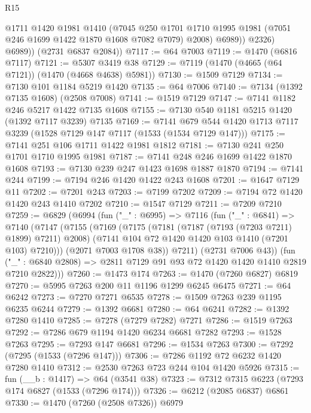 \begin{lexlean}{R15}
\begin{coremodule}
                @1711
                @1420
                @1981
                @1410
                (@7045
                  @250
                  @1701
                  @1710
                  @1995
                  @1981
                  (@7051 @246 @1699 @1422 @1870 @1608 @7082 @7079)
                  @2008)
                @6989))
            @2326)
          @6989))
      (@2731 @6837 @2084))
@7117 := @64 @7003
@7119 := @1470 (@6816 @7117)
@7121 := @5307 @3419 @38
@7129 := @7119 (@1470 (@4665 (@64 @7121)) (@1470 (@4668 @4638) @5981))
@7130 := @1509 @7129
@7134 := @7130 @101 @1184 @5219 @1420
@7135 := @64 @7006
@7140 := @7134 (@1392 @7135 @1608) (@2508 @7008)
@7141 := @1519 @7129
@7147 := @7141 @1182 @246 @5217 @1422 @7135 @1608
@7155 := @7130 @540 @1181 @5215 @1420 (@1392 @7117 @3239) @7135
@7169 := @7141 @679 @544 @1420 @1713 @7117 @3239 (@1528 @7129 @147 @7117 (@1533 (@1534 @7129 @147)))
@7175 := @7141 @251 @106 @1711 @1422 @1981 @1812
@7181 := @7130 @241 @250 @1701 @1710 @1995 @1981
@7187 := @7141 @248 @246 @1699 @1422 @1870 @1608
@7193 := @7130 @239 @247 @1423 @1698 @1887 @1870
@7194 := @7141 @244
@7199 := @7194 @246 @1420 @1422 @243 @1608
@7201 := @1647 @7129 @11
@7202 := @7201 @243
@7203 := @7199 @7202
@7209 := @7194 @72 @1420 @1420 @243 @1410 @7202
@7210 := @1547 @7129
@7211 := @7209 @7210
@7259 := @6829
    (@6994
      (fun ("_" : @6995) =>
      @7116
        (fun ("_" : @6841) =>
        @7140
          (@7147
            (@7155
              (@7169
                (@7175
                  (@7181 (@7187 (@7193 (@7203 @7211) @1899) @7211) @2008)
                  (@7141 @104 @72 @1420 @1420 @103 @1410 (@7201 @103) @7210)))
              (@2071 @7003 @1708 @38))
            @7211)
          (@2731 @7006 @43))
        (fun ("_" : @6840 @2808) => @2811 @7129 @91 @93 @72 @1420 @1420 @1410 @2819 @7210 @2822)))
@7260 := @1473 @174
@7263 := @1470 (@7260 @6827) @6819
@7270 := @5995 @7263 @200 @11 @1196 @1299 @6245 @6475
@7271 := @64 @6242
@7273 := @7270 @7271 @6535
@7278 := @1509 @7263 @239 @1195 @6235 @6244
@7279 := @1392 @6681
@7280 := @64 @6241
@7282 := @1392 @7280 @1410
@7285 := @7278 (@7279 @7282) @7271
@7286 := @1519 @7263
@7292 := @7286 @679 @1194 @1420 @6234 @6681 @7282
@7293 := @1528 @7263
@7295 := @7293 @147 @6681
@7296 := @1534 @7263
@7300 := @7292 (@7295 (@1533 (@7296 @147)))
@7306 := @7286 @1192 @72 @6232 @1420 @7280 @1410
@7312 := @2530 @7263 @723 @244 @104 @1420 @5926
@7315 := fun (__b : @1417) => @64 (@3541 @38)
@7323 := @7312 @7315 @6223 (@7293 @174 @6827 (@1533 (@7296 @174)))
@7326 := @6212 (@2085 @6837) @6861
@7330 := @1470 (@7260 (@2508 @7326)) @6979

\end{coremodule}
\end{lexlean}
